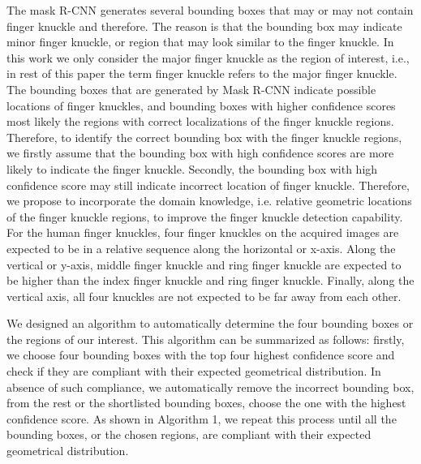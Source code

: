The mask R-CNN generates several bounding boxes that may or may not contain finger knuckle and therefore. The reason is that the bounding box may indicate minor finger knuckle, or region that may look similar to the finger knuckle. In this work we only consider the major finger knuckle as the region of interest, i.e., in rest of this paper the term finger knuckle refers to the major finger knuckle. The bounding boxes that are generated by Mask R-CNN indicate possible locations of finger knuckles, and bounding boxes with higher confidence scores most likely the regions with correct localizations of the finger knuckle regions. Therefore, to identify the correct bounding box with the finger knuckle regions, we firstly assume that the bounding box with high confidence scores are more likely to indicate the finger knuckle. Secondly, the bounding box with high confidence score may still indicate incorrect location of finger knuckle. Therefore, we propose to incorporate the domain knowledge, i.e. relative geometric locations of the finger knuckle regions, to improve the finger knuckle detection capability. For the human finger knuckles, four finger knuckles on the acquired images are expected to be in a relative sequence along the horizontal or x-axis. Along the vertical or y-axis, middle finger knuckle and ring finger knuckle are expected to be higher than the index finger knuckle and ring finger knuckle. Finally, along the vertical axis, all four knuckles are not expected to be far away from each other.

We designed an algorithm to automatically determine the four bounding boxes or the regions of our interest. This algorithm can be summarized as follows: firstly, we choose four bounding boxes with the top four highest confidence score and check if they are compliant with their expected geometrical distribution. In absence of such compliance, we automatically remove the incorrect bounding box, from the rest or the shortlisted bounding boxes, choose the one with the highest confidence score. As shown in Algorithm 1, we repeat this process until all the bounding boxes, or the chosen regions, are compliant with their expected geometrical distribution.

